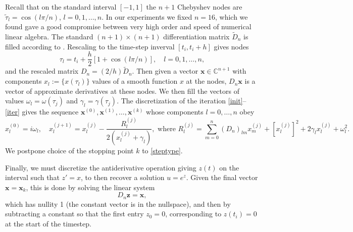 \documentclass[10pt]{article}
\newcommand{\be}{\begin{equation}}
\newcommand{\ee}{\end{equation}}
\newcommand{\mbf}[1]{{\mathbf #1}}
\newcommand{\C}{\mathbb{C}}
\newcommand{\om}{\omega}
\newcommand{\g}{\gamma}
\begin{document}
Recall that on the standard interval $[-1, 1]$ the $n+1$ Chebyshev nodes are
$\tilde\tau_l = \cos\left( l\pi/n\right)$, $l = 0, 1, \dots, n$.
In our experiments we fixed $n=16$, which we found gave a good compromise
between very high order and speed of numerical linear algebra.
The standard $(n+1) \times (n+1)$ differentiation matrix $\tilde{D}_n$
is filled according to \cite[Ch.~6]{tref}.
Rescaling to the time-step inverval $[t_i, t_i+h]$
gives nodes
\be\label{scaledt}
\tau_l = t_i + \frac{h}{2}[1+\cos (l\pi/n)], \quad l = 0, 1, \ldots, n,
\ee
and the rescaled matrix $D_n = (2/h) \tilde D_n$.
Then given a vector $\mbf{x}\in\C^{n+1}$ with components
${x_l := \{x(\tau_l)\}}$ values of a smooth function $x$ at the nodes,
$D_n\mbf{x}$ is a vector of approximate derivatives at these nodes.
We then fill the vectors of values $\om_l=\om(\tau_j)$
and $\g_l=\gamma(\tau_j)$.
The discretization of the iteration \cref{init}--\cref{iter}
gives the sequence $\mbf{x}^{(0)}, \mbf{x}^{(1)},\dots,\mbf{x}^{(k)}$ whose
components $l=0,\dots, n$ obey
$$
x^{(0)}_l = i\om_l, \quad
x^{(j+1)}_l = x^{(j)}_l - \frac{R^{(j)}_l}{2(x^{(j)}_l + \g_l)}, \text{ where }
R^{(j)}_l = \sum_{m=0}^n (D_n)_{lm}x^{(j)}_m  + [x^{(j)}_l]^2 + 2\g_lx^{(j)}_l + \om_l^2 .
$$
We postpone choice of the stopping point $k$ to \cref{steptype}.

Finally, we must discretize the antiderivative operation giving
$z(t)$ on the interval such that $z' = x$, to then recover a solution $u = e^z$.
Given the final vector $\mbf{x}=\mbf{x}_k$, this is done by solving
the linear system
\be
D_n \mbf{z} = \mbf{x}, \label{antider}
\ee
which has nullity 1 (the constant vector is in the nullspace),
and then by subtracting a constant so that the first entry $z_0=0$,
corresponding to $z(t_i)=0$ at the start of the timestep.
\end{document}
